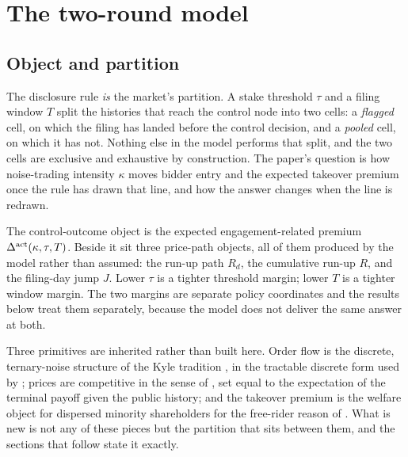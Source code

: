 %
%

\section{The two-round model}
\label{sec:model-v4}

\subsection{Object and partition}
\label{sec:object}

The disclosure rule \emph{is} the market's partition. A stake threshold $\tau$ and a filing window
$T$ split the histories that reach the control node into two cells: a \emph{flagged} cell, on which
the filing has landed before the control decision, and a \emph{pooled} cell, on which it has not.
Nothing else in the model performs that split, and the two cells are exclusive and exhaustive by
construction. The paper's question is how noise-trading intensity $\kappa$ moves bidder entry and
the expected takeover premium once the rule has drawn that line, and how the answer changes when the
line is redrawn.

The control-outcome object is the expected engagement-related premium
$\Delta^{\mathrm{act}}(\kappa,\tau,T)$. Beside it sit three price-path objects, all of them produced by the model
rather than assumed: the run-up path $R_d$, the cumulative run-up $R$, and the filing-day jump $J$.
Lower $\tau$ is a tighter threshold margin; lower $T$ is a tighter window margin. The two margins are
separate policy coordinates and the results below treat them separately, because the model does not
deliver the same answer at both.

Three primitives are inherited rather than built here. Order flow is the discrete, ternary-noise
structure of the Kyle tradition \citep{Kyle1985}, in the tractable discrete form used by
\citet{EdmansGoldsteinJiang2015}; prices are competitive in the sense of
\citet{GlostenMilgrom1985}, set equal to the expectation of the terminal payoff given the public
history; and the takeover premium is the welfare object for dispersed minority shareholders for the
free-rider reason of \citet{GrossmanHart1980}. What is new is not any of these pieces but the
partition that sits between them, and the sections that follow state it exactly.

